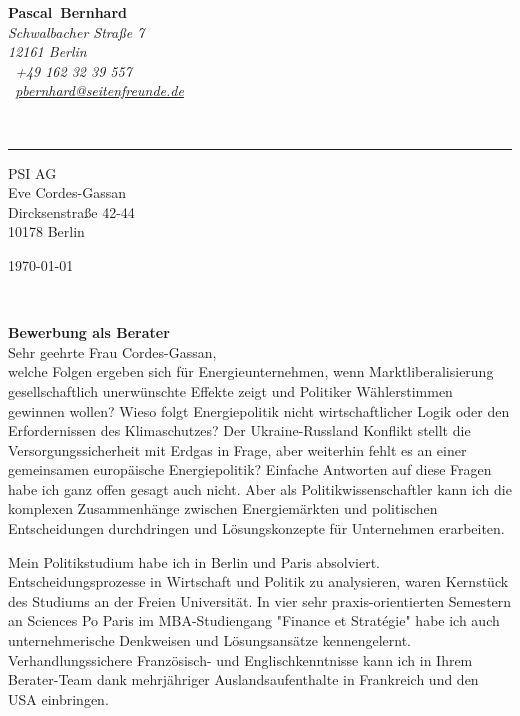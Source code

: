 \documentclass[11pt,a4paper]{article}
\def\firstname{Pascal}
\def\familyname{Bernhard}
\begin{document}
\sffamily   %
\hfill%
\begin{minipage}[t]{.6\textwidth}
	\raggedleft%
	{\bfseries {\color{firstnamecolor}\firstname}~{\color{familynamecolor}\familyname}}\\[.35ex]
	\small\itshape%
	Schwalbacher Straße 7\\
	12161 Berlin\\[.35ex]
	\Mobilefone~+49 162 32 39 557 \\
	\Letter~\href{mailto:pbernhard@seitenfreunde.de}{pbernhard@seitenfreunde.de}
\end{minipage}\\[0.5em]
%
{\color{firstnamecolor}\rule{\textwidth}{.25ex}}
%
\begin{minipage}[t]{.4\textwidth}
	\raggedright%
	\vspace*{1em}
	PSI AG \\
	Eve Cordes-Gassan\\[.35ex]
	\small%
	Dircksenstraße 42-44\\
	10178 Berlin
\end{minipage}
%
\hfill
%
\begin{minipage}[t]{.4\textwidth}
	\raggedleft %
	\today
\end{minipage}\\[1em]
\raggedright

{\bfseries \color{familynamecolor}Bewerbung als Berater}\\[1.5em]

Sehr geehrte Frau Cordes-Gassan,\\[1em]
%
welche Folgen ergeben sich für Energieunternehmen, wenn Marktliberalisierung gesellschaftlich unerwünschte Effekte zeigt und Politiker Wählerstimmen gewinnen wollen? Wieso folgt Energiepolitik nicht wirtschaftlicher Logik oder den Erfordernissen des Klimaschutzes? Der Ukraine-Russland Konflikt stellt die Versorgungssicherheit mit Erdgas in Frage, aber weiterhin fehlt es an einer gemeinsamen europäische Energiepolitik? Einfache Antworten auf diese Fragen habe ich ganz offen gesagt auch nicht. Aber als Politikwissenschaftler kann ich die komplexen Zusammenhänge zwischen Energiemärkten und politischen Entscheidungen durchdringen und Lösungskonzepte für Unternehmen erarbeiten.


Mein Politikstudium habe ich in Berlin und Paris absolviert. Entscheidungsprozesse in Wirtschaft und Politik zu analysieren, waren Kernstück des Studiums an der Freien Universität. In vier sehr praxis-orientierten Semestern an Sciences Po Paris im MBA-Studiengang "Finance et Stratégie" habe ich  auch unternehmerische Denkweisen und Lösungsansätze kennengelernt. Verhandlungssichere Französisch- und Englischkenntnisse kann ich in Ihrem Berater-Team dank mehrjähriger Auslandsaufenthalte in Frankreich und den USA einbringen.
\end{document}
